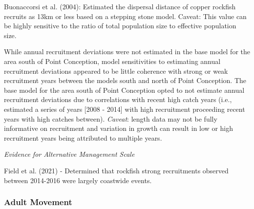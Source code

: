 \documentclass[11pt,
  english,
  a4paper,
]{article}
\begin{document}
\leavevmode\tagmcend\tagstructend\par


Buonaccorsi et al. {(2004)\leavevmode\tagmcend\tagstructend}: Estimated the dispersal distance of copper rockfish recruits as 13km or less based on a stepping stone model. Caveat: This value can be highly sensitive to the ratio of total population size to effective population size.

\leavevmode\tagmcend\tagstructend\par


While annual recruitment deviations were not estimated in the base model for the area south of Point Conception, model sensitivities to estimating annual recruitment deviations appeared to be little coherence with strong or weak recruitment years between the models south and north of Point Conception. The base model for the area south of Point Conception opted to not estimate annual recruitment deviations due to correlations with recent high catch years (i.e., estimated a series of years {[}2008 - 2014{]} with high recruitment proceeding recent years with high catches between). \emph{Caveat}: length data may not be fully informative on recruitment and variation in growth can result in low or high recruitment years being attributed to multiple years.

\leavevmode\tagmcend\tagstructend\par


\emph{Evidence for Alternative Management Scale}

\leavevmode\tagmcend\tagstructend\par


Field et al. {(2021)\leavevmode\tagmcend\tagstructend} - Determined that rockfish strong recruitments observed between 2014-2016 were largely coastwide events.

\leavevmode\tagmcend\tagstructend\par


\hypertarget{adult-movement}{%
\subsubsection{Adult Movement}\label{adult-movement}}
\end{document}

